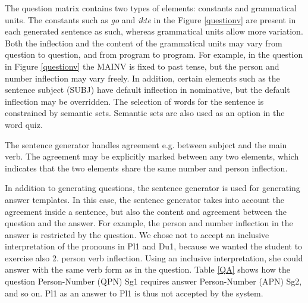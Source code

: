 \documentclass[11pt]{article}
\begin{document}
The question matrix contains two types of elements: constants and grammatical units. The constants such as \textit{go} and \textit{ikte} in the Figure \ref{questionv} are present in each generated sentence as such, whereas grammatical units allow more variation. Both the inflection and the content of the grammatical units may vary from question to question, and from program to program. For example, in the question in Figure \ref{questionv} the MAINV is fixed to past tense, but the person and number inflection may vary freely. In addition, certain elements such as the sentence subject (SUBJ) have default inflection in nominative, but the default inflection may be overridden. The selection of words for the sentence is constrained by semantic sets. Semantic sets are also used as an option in the word quiz. 
%

The sentence generator handles agreement e.g. between subject and the main verb. The agreement may be explicitly marked between any two elements, which indicates that the two elements share the same number and person inflection.

In addition to generating questions, the sentence generator is used for generating answer templates. In this case, the sentence generator takes into account the agreement inside a sentence, but also the content and agreement between the question and the answer. For example, the person and number inflection in the answer is restricted by the question. We chose not to accept an inclusive interpretation of the pronouns in Pl1 and Du1, because we wanted the student to exercise also 2. person verb inflection. Using an inclusive interpretation, she could answer with the same verb form as in the question. Table \ref{QA} shows how the question Person-Number (QPN) Sg1 requires answer Person-Number (APN) Sg2, and so on. Pl1 as an answer to Pl1 is thus not accepted by the system.\\
\end{document}
